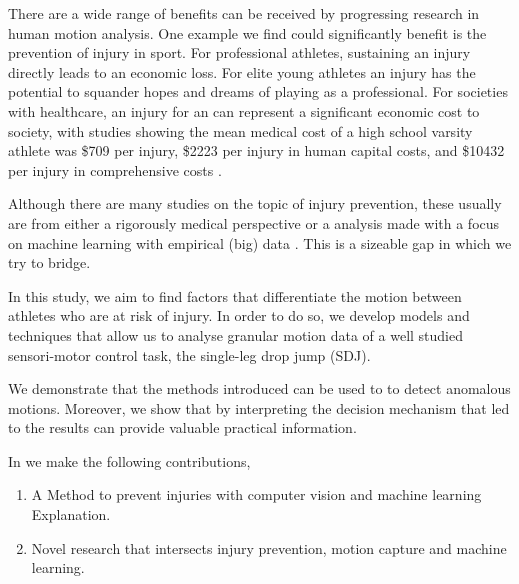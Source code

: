 There are a wide range of benefits can be received by progressing research in human motion analysis. One example we find could significantly benefit is the prevention of injury in sport. For professional athletes, sustaining an injury directly leads to an economic loss. For elite young athletes an injury has the potential to squander hopes and dreams of playing as a professional. For societies with healthcare, an injury for an can represent a significant economic cost to society, with studies showing the mean medical cost of a high school varsity athlete was \$709 per injury, \$2223 per injury in human capital costs, and \$10432 per injury in comprehensive costs \cite{knowles2007cost}.

Although there are many studies on the topic of injury prevention, these usually are from either a rigorously medical perspective \cite{myer2004rationale} or a analysis made with a focus on machine learning with empirical (big) data \cite{alderson2015markerless}. This is a sizeable gap in which we try to bridge. 

In this study, we aim to find factors that differentiate the motion between athletes who are at risk of injury. In order to do so, we develop models and techniques that allow us to analyse granular motion data of a well studied sensori-motor control task, the single-leg drop jump (SDJ). 

We demonstrate that the methods introduced can be used to to detect anomalous motions. Moreover, we show that by interpreting the decision mechanism that led to the results can provide valuable practical information.

In we make the following contributions,
\begin{enumerate}
    \item A Method to prevent injuries with computer vision and machine learning Explanation.
    \item Novel research that intersects injury prevention, motion capture and machine learning.
\end{enumerate}




